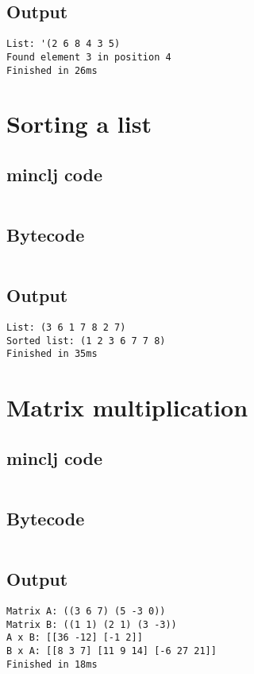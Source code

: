\documentclass[11pt]{scrreprt}
\begin{document}
\subsection{Output}
\begin{verbatim}
List: '(2 6 8 4 3 5)
Found element 3 in position 4
Finished in 26ms
\end{verbatim}

\section{Sorting a list}
\subsection{minclj code}
\inputminted{clojure}{/home/mario/git/MarioJim/miniclj/examples/sort_list.clj}

\subsection{Bytecode}
\inputminted{text}{/home/mario/git/MarioJim/miniclj/examples/sort_list.mclj}

\subsection{Output}
\begin{verbatim}
List: (3 6 1 7 8 2 7)
Sorted list: (1 2 3 6 7 7 8)
Finished in 35ms
\end{verbatim}

\section{Matrix multiplication}
\subsection{minclj code}
\inputminted{clojure}{/home/mario/git/MarioJim/miniclj/examples/matrix_multiplication.clj}

\subsection{Bytecode}
\inputminted{text}{/home/mario/git/MarioJim/miniclj/examples/matrix_multiplication.mclj}

\subsection{Output}
\begin{verbatim}
Matrix A: ((3 6 7) (5 -3 0))
Matrix B: ((1 1) (2 1) (3 -3))
A x B: [[36 -12] [-1 2]]
B x A: [[8 3 7] [11 9 14] [-6 27 21]]
Finished in 18ms
\end{verbatim}
\end{document}

